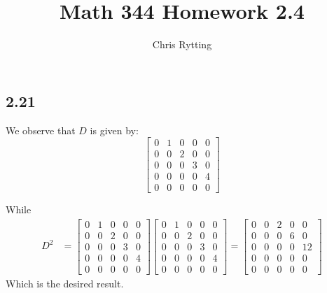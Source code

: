 \documentclass[letterpaper,12pt]{article}
\theoremstyle{definition}
\begin{document}
\title{Math 344 Homework 2.4}
\author{Chris Rytting}
\maketitle
\subsection*{2.21}
We observe that $D$ is given by:
\[
    \begin{bmatrix}
        0 & 1 & 0 & 0 & 0 \\
        0 & 0 & 2 & 0 & 0 \\
        0 & 0 & 0 & 3 & 0 \\
        0 & 0 & 0 & 0 & 4 \\
        0 & 0 & 0 & 0 & 0 
    \end{bmatrix}
\]

While
\begin{align*}
    D^2
    &= 
    \begin{bmatrix}
        0 & 1 & 0 & 0 & 0 \\
        0 & 0 & 2 & 0 & 0 \\
        0 & 0 & 0 & 3 & 0 \\
        0 & 0 & 0 & 0 & 4 \\
        0 & 0 & 0 & 0 & 0 
    \end{bmatrix}
    \begin{bmatrix}
        0 & 1 & 0 & 0 & 0 \\
        0 & 0 & 2 & 0 & 0 \\
        0 & 0 & 0 & 3 & 0 \\
        0 & 0 & 0 & 0 & 4 \\
        0 & 0 & 0 & 0 & 0 
    \end{bmatrix}
    = 
    \begin{bmatrix}
        0 & 0 & 2 & 0 & 0 \\
        0 & 0 & 0 & 6 & 0 \\
        0 & 0 & 0 & 0 & 12 \\
        0 & 0 & 0 & 0 & 0 \\
        0 & 0 & 0 & 0 & 0 
    \end{bmatrix}
\end{align*}
Which is the desired result.
\end{document}

